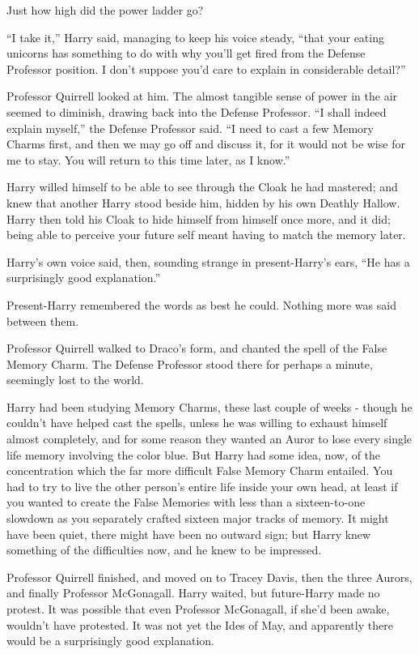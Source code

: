 Just how high did the power ladder go?

``I take it,'' Harry said, managing to keep his voice steady, ``that
your eating unicorns has something to do with why you'll get fired from
the Defense Professor position. I don't suppose you'd care to explain in
considerable detail?''

Professor Quirrell looked at him. The almost tangible sense of power in
the air seemed to diminish, drawing back into the Defense Professor. ``I
shall indeed explain myself,'' the Defense Professor said. ``I need to
cast a few Memory Charms first, and then we may go off and discuss it,
for it would not be wise for me to stay. You will return to this time
later, as I know.''

Harry willed himself to be able to see through the Cloak he had
mastered; and knew that another Harry stood beside him, hidden by his
own Deathly Hallow. Harry then told his Cloak to hide himself from
himself once more, and it did; being able to perceive your future self
meant having to match the memory later.

Harry's own voice said, then, sounding strange in present-Harry's ears,
``He has a surprisingly good explanation.''

Present-Harry remembered the words as best he could. Nothing more was
said between them.

Professor Quirrell walked to Draco's form, and chanted the spell of the
False Memory Charm. The Defense Professor stood there for perhaps a
minute, seemingly lost to the world.

Harry had been studying Memory Charms, these last couple of weeks -
though he couldn't have helped cast the spells, unless he was willing to
exhaust himself almost completely, and for some reason they wanted an
Auror to lose every single life memory involving the color blue. But
Harry had some idea, now, of the concentration which the far more
difficult False Memory Charm entailed. You had to try to live the other
person's entire life inside your own head, at least if you wanted to
create the False Memories with less than a sixteen-to-one slowdown as
you separately crafted sixteen major tracks of memory. It might have
been quiet, there might have been no outward sign; but Harry knew
something of the difficulties now, and he knew to be impressed.

Professor Quirrell finished, and moved on to Tracey Davis, then the
three Aurors, and finally Professor McGonagall. Harry waited, but
future-Harry made no protest. It was possible that even Professor
McGonagall, if she'd been awake, wouldn't have protested. It was not yet
the Ides of May, and apparently there would be a surprisingly good
explanation.

